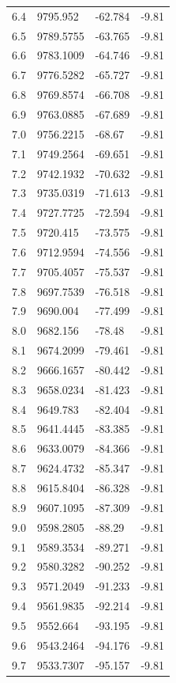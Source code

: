 \begin{table}[H]
\begin{tabular}{llll}
6.4 & 9795.952 & -62.784 & -9.81 \\
6.5 & 9789.5755 & -63.765 & -9.81 \\
6.6 & 9783.1009 & -64.746 & -9.81 \\
6.7 & 9776.5282 & -65.727 & -9.81 \\
6.8 & 9769.8574 & -66.708 & -9.81 \\
6.9 & 9763.0885 & -67.689 & -9.81 \\
7.0 & 9756.2215 & -68.67 & -9.81 \\
7.1 & 9749.2564 & -69.651 & -9.81 \\
7.2 & 9742.1932 & -70.632 & -9.81 \\
7.3 & 9735.0319 & -71.613 & -9.81 \\
7.4 & 9727.7725 & -72.594 & -9.81 \\
7.5 & 9720.415 & -73.575 & -9.81 \\
7.6 & 9712.9594 & -74.556 & -9.81 \\
7.7 & 9705.4057 & -75.537 & -9.81 \\
7.8 & 9697.7539 & -76.518 & -9.81 \\
7.9 & 9690.004 & -77.499 & -9.81 \\
8.0 & 9682.156 & -78.48 & -9.81 \\
8.1 & 9674.2099 & -79.461 & -9.81 \\
8.2 & 9666.1657 & -80.442 & -9.81 \\
8.3 & 9658.0234 & -81.423 & -9.81 \\
8.4 & 9649.783 & -82.404 & -9.81 \\
8.5 & 9641.4445 & -83.385 & -9.81 \\
8.6 & 9633.0079 & -84.366 & -9.81 \\
8.7 & 9624.4732 & -85.347 & -9.81 \\
8.8 & 9615.8404 & -86.328 & -9.81 \\
8.9 & 9607.1095 & -87.309 & -9.81 \\
9.0 & 9598.2805 & -88.29 & -9.81 \\
9.1 & 9589.3534 & -89.271 & -9.81 \\
9.2 & 9580.3282 & -90.252 & -9.81 \\
9.3 & 9571.2049 & -91.233 & -9.81 \\
9.4 & 9561.9835 & -92.214 & -9.81 \\
9.5 & 9552.664 & -93.195 & -9.81 \\
9.6 & 9543.2464 & -94.176 & -9.81 \\
9.7 & 9533.7307 & -95.157 & -9.81 \\

\end{tabular}
\end{table}
